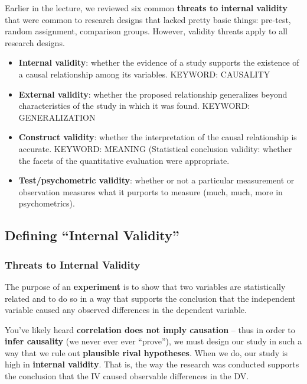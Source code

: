 \documentclass[
  english,
]{book}
\providecommand{\tightlist}{%
  \setlength{\itemsep}{0pt}\setlength{\parskip}{0pt}}
\begin{document}
Earlier in the lecture, we reviewed six common \textbf{threats to internal validity} that were common to research designs that lacked pretty basic things: pre-test, random assignment, comparison groups. However, validity threats apply to all research designs.

\begin{itemize}
\tightlist
\item
  \textbf{Internal validity}: whether the evidence of a study supports the existence of a causal relationship among its variables. KEYWORD: CAUSALITY
\item
  \textbf{External validity}: whether the proposed relationship generalizes beyond characteristics of the study in which it was found. KEYWORD: GENERALIZATION
\item
  \textbf{Construct validity}: whether the interpretation of the causal relationship is accurate. KEYWORD: MEANING
  (Statistical conclusion validity: whether the facets of the quantitative evaluation were appropriate.
\item
  \textbf{Test/psychometric validity}: whether or not a particular measurement or observation measures what it purports to measure (much, much, more in psychometrics).
\end{itemize}

\hypertarget{defining-internal-validity-1}{%
\subsection{Defining ``Internal Validity''}\label{defining-internal-validity-1}}

\hypertarget{threats-to-internal-validity-1}{%
\subsubsection{Threats to Internal Validity}\label{threats-to-internal-validity-1}}

The purpose of an \textbf{experiment} is to show that two variables are statistically related and to do so in a way that supports the conclusion that the independent variable caused any observed differences in the dependent variable.

You've likely heard \textbf{correlation does not imply causation} -- thus in order to \textbf{infer causality} (we never ever ever ``prove''), we must design our study in such a way that we rule out \textbf{plausible rival hypotheses}. When we do, our study is high in \textbf{internal validity}. That is, the way the research was conducted supports the conclusion that the IV caused observable differences in the DV.
\end{document}
